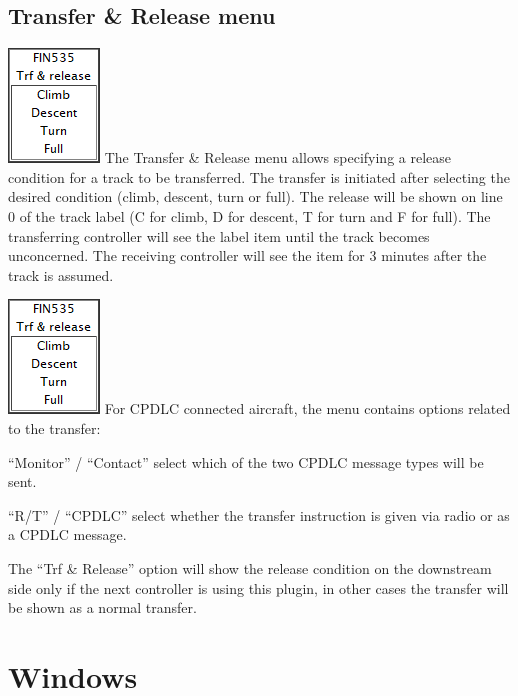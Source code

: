 \documentclass[11pt,a4paper,oldfontcommands]{memoir}
\newenvironment{Warn}
  {\begin{shaded}\marginnote{\fbox{Warning}}}
  {\end{shaded}}
\begin{document}
\subsection{Transfer \& Release menu}
\label{menu:xfrrel}
\includegraphics{img/xfrrel.png}
The Transfer \& Release menu allows specifying a release condition for a track to be
transferred. The transfer is initiated after selecting the desired condition (climb, descent,
turn or full). The release will be shown on line 0 of the track label (C for climb, D for
descent, T for turn and F for full). The transferring controller will see the label item until
the track becomes unconcerned. The receiving controller will see the item for 3 minutes
after the track is assumed.

\includegraphics{img/xfrrel.png}
For CPDLC connected aircraft, the menu contains options related to the transfer:

“Monitor” / “Contact” select which of the two CPDLC message types will be sent.

“R/T” / “CPDLC” select whether the transfer instruction is given via radio or as a CPDLC
message.

\begin{Warn}
The “Trf \& Release” option will show the release condition on the downstream side only if the
next controller is using this plugin, in other cases the transfer will be shown as a normal transfer.
\end{Warn}













\section{Windows}
\end{document}
